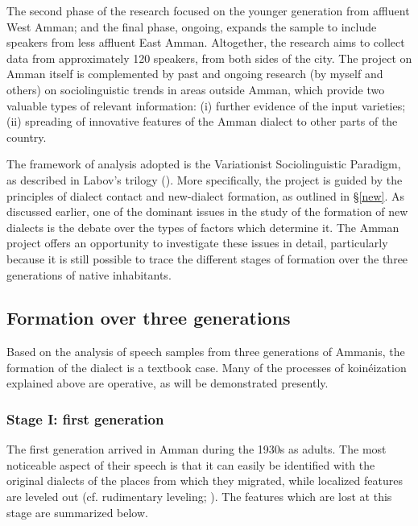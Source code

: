 \documentclass[output=paper]{langsci/langscibook}
\begin{document}
The second phase of the research focused on the younger generation from affluent West Amman; and the final phase, ongoing, expands the sample to include speakers from less affluent East Amman. Altogether, the research aims to collect data from approximately 120 speakers, from both sides of the city. The project on Amman itself is complemented by past and ongoing research (by myself and others) on sociolinguistic trends in areas outside Amman, which provide two valuable types of relevant information: (i) further evidence of the input varieties; (ii) spreading of innovative features of the Amman dialect to other parts of the country.

The framework of analysis adopted is the Variationist Sociolinguistic Paradigm, as described in Labov’s trilogy (\citeyear{Labov1994,Labov2001,Labov2010}). More specifically, the project is guided by the principles of dialect contact and new-dialect formation, as outlined in §\ref{new}. As discussed earlier, one of the dominant issues in the study of the formation of new dialects is the debate over the types of factors which determine it. The Amman project offers an opportunity to investigate these issues in detail, particularly because it is still possible to trace the different stages of formation over the three generations of native inhabitants.

\subsection{Formation over three generations} \label{three}

Based on the analysis of speech samples from three generations of Ammanis, the formation of the dialect is a textbook case. Many of the processes of koinéization explained above are operative, as will be demonstrated presently.

\subsubsection{Stage I: first generation}

The first generation arrived in Amman during the 1930s as adults. The most noticeable aspect of their speech is that it can easily be identified with the original dialects of the places from which they migrated, while localized features are leveled out (cf. rudimentary leveling; \citealt{Trudgill2004}). The features which are lost at this stage are summarized below.
\end{document}
